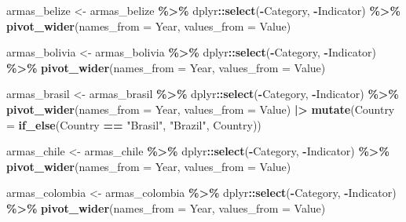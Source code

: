 \documentclass[
  11pt,
]{article}
\newenvironment{Shaded}{\begin{snugshade}}{\end{snugshade}}
\newcommand{\AttributeTok}[1]{\textcolor[rgb]{0.13,0.29,0.53}{#1}}
\newcommand{\FunctionTok}[1]{\textcolor[rgb]{0.13,0.29,0.53}{\textbf{#1}}}
\newcommand{\NormalTok}[1]{#1}
\newcommand{\OtherTok}[1]{\textcolor[rgb]{0.56,0.35,0.01}{#1}}
\newcommand{\SpecialCharTok}[1]{\textcolor[rgb]{0.81,0.36,0.00}{\textbf{#1}}}
\newcommand{\StringTok}[1]{\textcolor[rgb]{0.31,0.60,0.02}{#1}}
\begin{document}
\begin{Shaded}
\begin{Highlighting}[]
\NormalTok{armas\_belize }\OtherTok{\textless{}{-}}\NormalTok{ armas\_belize }\SpecialCharTok{\%\textgreater{}\%}
\NormalTok{  dplyr}\SpecialCharTok{::}\FunctionTok{select}\NormalTok{(}\SpecialCharTok{{-}}\NormalTok{Category, }\SpecialCharTok{{-}}\NormalTok{Indicator) }\SpecialCharTok{\%\textgreater{}\%}
  \FunctionTok{pivot\_wider}\NormalTok{(}\AttributeTok{names\_from =}\NormalTok{ Year, }\AttributeTok{values\_from =}\NormalTok{ Value)}

\NormalTok{armas\_bolivia }\OtherTok{\textless{}{-}}\NormalTok{ armas\_bolivia }\SpecialCharTok{\%\textgreater{}\%}
\NormalTok{  dplyr}\SpecialCharTok{::}\FunctionTok{select}\NormalTok{(}\SpecialCharTok{{-}}\NormalTok{Category, }\SpecialCharTok{{-}}\NormalTok{Indicator) }\SpecialCharTok{\%\textgreater{}\%}
  \FunctionTok{pivot\_wider}\NormalTok{(}\AttributeTok{names\_from =}\NormalTok{ Year, }\AttributeTok{values\_from =}\NormalTok{ Value)}

\NormalTok{armas\_brasil }\OtherTok{\textless{}{-}}\NormalTok{ armas\_brasil }\SpecialCharTok{\%\textgreater{}\%}
\NormalTok{  dplyr}\SpecialCharTok{::}\FunctionTok{select}\NormalTok{(}\SpecialCharTok{{-}}\NormalTok{Category, }\SpecialCharTok{{-}}\NormalTok{Indicator) }\SpecialCharTok{\%\textgreater{}\%}
  \FunctionTok{pivot\_wider}\NormalTok{(}\AttributeTok{names\_from =}\NormalTok{ Year, }\AttributeTok{values\_from =}\NormalTok{ Value) }\SpecialCharTok{|\textgreater{}}
  \FunctionTok{mutate}\NormalTok{(}\AttributeTok{Country =} \FunctionTok{if\_else}\NormalTok{(Country }\SpecialCharTok{==} \StringTok{"Brasil"}\NormalTok{, }\StringTok{"Brazil"}\NormalTok{, Country))}

\NormalTok{armas\_chile }\OtherTok{\textless{}{-}}\NormalTok{ armas\_chile }\SpecialCharTok{\%\textgreater{}\%}
\NormalTok{  dplyr}\SpecialCharTok{::}\FunctionTok{select}\NormalTok{(}\SpecialCharTok{{-}}\NormalTok{Category, }\SpecialCharTok{{-}}\NormalTok{Indicator) }\SpecialCharTok{\%\textgreater{}\%}
  \FunctionTok{pivot\_wider}\NormalTok{(}\AttributeTok{names\_from =}\NormalTok{ Year, }\AttributeTok{values\_from =}\NormalTok{ Value)}

\NormalTok{armas\_colombia }\OtherTok{\textless{}{-}}\NormalTok{ armas\_colombia }\SpecialCharTok{\%\textgreater{}\%}
\NormalTok{  dplyr}\SpecialCharTok{::}\FunctionTok{select}\NormalTok{(}\SpecialCharTok{{-}}\NormalTok{Category, }\SpecialCharTok{{-}}\NormalTok{Indicator) }\SpecialCharTok{\%\textgreater{}\%}
  \FunctionTok{pivot\_wider}\NormalTok{(}\AttributeTok{names\_from =}\NormalTok{ Year, }\AttributeTok{values\_from =}\NormalTok{ Value)}


\end{Highlighting}
\end{Shaded}
\end{document}
